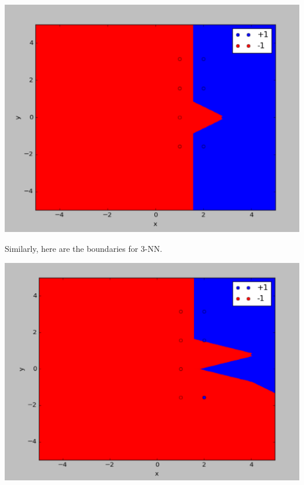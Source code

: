 \documentclass[12pt]{article}
\begin{document}
\begin{enumerate}[label=(\alph*)]
	\includegraphics[scale=0.6]{6-1b1.png}
	
	Similarly, here are the boundaries for 3-NN.
	
	\includegraphics[scale=0.6]{6-1b2.png}
\end{enumerate}
\end{document}
